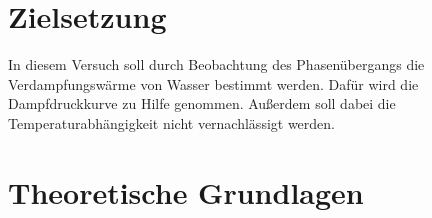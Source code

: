 \section{Zielsetzung}

In diesem Versuch soll durch Beobachtung des Phasenübergangs die 
Verdampfungswärme von Wasser bestimmt werden. Dafür wird die Dampfdruckkurve zu Hilfe genommen. Außerdem soll dabei die Temperaturabhängigkeit nicht vernachlässigt werden.

\section{Theoretische Grundlagen}


